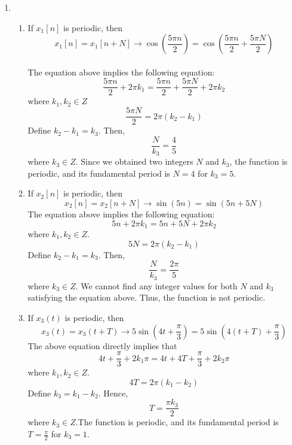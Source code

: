 \documentclass[10pt,a4paper, margin=1in]{article}
\begin{document}
\begin{enumerate}
\item %
    \begin{enumerate}   
    \item %
    If $x_1[n]$ is periodic, then \\
    $$x_1[n]=x_1[n+N]\rightarrow\cos{(\frac{5\pi n}{2})}=\cos{(\frac{5\pi n}{2}+\frac{5\pi N}{2})}$$ \\
    The equation above implies the following equation: \\ 
    $$\frac{5\pi n}{2}+2\pi k_1 = \frac{5\pi n}{2}+\frac{5\pi N}{2}+2\pi k_2$$ where $k_1,k_2\in Z$\\
    $$\frac{5\pi N}{2}=2\pi (k_2-k_1)$$
    Define $k_2-k_1=k_3$. Then, \\
    $$\frac{N}{k_3}=\frac{4}{5}$$
    where $k_3 \in Z$. Since we obtained two integers $N$ and $k_3$, the function is periodic, and its fundamental period is $N=4$ for $k_3=5$.\\
    \item %
    If $x_2[n]$ is periodic, then \\
    $$x_2[n]=x_2[n+N]\rightarrow\sin{(5n)}=\sin{(5n+5N)}$$
    The equation above implies the following equation: \\ 
    $$5n+2\pi k_1=5n+5N+2\pi k_2$$ where $k_1,k_2\in Z$.\\
    $$5N=2\pi (k_2-k_1)$$
    Define $k_2-k_1=k_3$. Then, \\
    $$\frac{N}{k_3}=\frac{2\pi}{5}$$ where $k_3\in Z$. We cannot find any integer values for both $N$ and $k_3$ satisfying the equation above. Thus, the function is not periodic. \\
    \item %
    If $x_3(t)$ is periodic, then
    $$x_3(t)=x_3(t+T)\rightarrow 5\sin{(4t+\frac{\pi}{3})}=5\sin{(4(t+T)+\frac{\pi}{3})}$$
    The above equation directly implies that
    $$4t+\frac{\pi}{3}+2k_1\pi=4t+4T+\frac{\pi}{3}+2k_2\pi$$ where $k_1,k_2\in Z$.\\
    $$4T=2\pi (k_1-k_2)$$
    Define $k_3=k_1-k_2$. Hence,
    $$T=\frac{\pi k_3}{2}$$ where $k_3\in Z$.The function is periodic, and its fundamental period is $T=\frac{\pi}{2}$ for $k_3=1$. \\
    \end{enumerate}


\end{enumerate}
\end{document}
